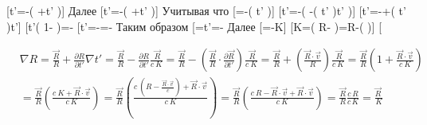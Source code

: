 \documentclass[11pt]{article}
\begin{document}
{[}\nabla t'=-\left(
+\nabla t'
\right){]} Далее {[}\nabla t'=-\left(
+\cdot {}\nabla t'
\right){]} Учитывая что
{[}=-\left(
t' \right){]} {[}\nabla t'=-\left(
-\cdot {}\left(
t' \right)\nabla t' \right){]}
{[}\nabla t'=-+\cdot {}\left(
t' \right)\nabla t'{]} {[}\nabla t'\left(
1-
\right)=-\frac{\overrightarrow{R}}{R}{]}
{[}\nabla t'=-=-\frac{\ \overrightarrow{R}}{c\ K}{]}
Таким образом
{[}\nabla {}=\cdot \nabla t'=-\frac{\ \overrightarrow{a}\cdot \overrightarrow{R}}{c\ K}{]}
Далее {[}\nabla {}=-\nabla K{]}
{[}\nabla K=\nabla \left(
R-
\right)=\nabla R-\nabla \left(
\cdot {} \right){]} {[}

\begin{align}
  & \nabla R=\frac{\overrightarrow{R}}{R}+\frac{\partial R}{\partial t'}\nabla t'=\frac{\overrightarrow{R}}{R}-\frac{\partial R}{\partial t'}\frac{\ \overrightarrow{R}}{c\ K}=\frac{\overrightarrow{R}}{R}-\left( \frac{\overrightarrow{R}}{R}\cdot \frac{\partial \overrightarrow{R}}{\partial t'} \right)\frac{\ \overrightarrow{R}}{c\ K}=\frac{\overrightarrow{R}}{R}+\left( \frac{\overrightarrow{R}\cdot \overrightarrow{v}}{R} \right)\frac{\ \overrightarrow{R}}{c\ K}=\frac{\overrightarrow{R}}{R}\left( 1+\frac{\overrightarrow{R}\cdot \overrightarrow{v}}{c\ K} \right) \\ 
 & =\frac{\overrightarrow{R}}{R}\left( \frac{c\ K+\overrightarrow{R}\cdot \overrightarrow{v}}{c\ K} \right)=\frac{\overrightarrow{R}}{R}\left( \frac{c\ \left( R-\frac{\overrightarrow{R}\cdot \overrightarrow{v}}{c} \right)+\overrightarrow{R}\cdot \overrightarrow{v}}{c\ K} \right)=\frac{\overrightarrow{R}}{R}\left( \frac{c\ R-\overrightarrow{R}\cdot \overrightarrow{v}+\overrightarrow{R}\cdot \overrightarrow{v}}{c\ K} \right)=\frac{\overrightarrow{R}}{R}\frac{c\,R}{c\,K}=\frac{\overrightarrow{R}\ }{K} \\ 
\end{align}
\end{document}
